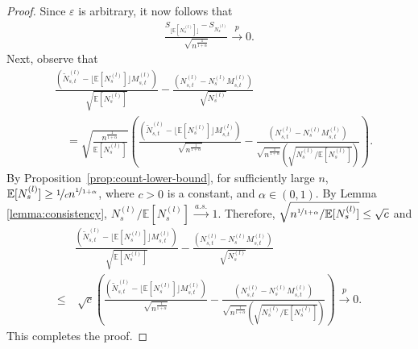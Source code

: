 \documentclass[twoside,11pt]{article}
\newcommand{\pow}[1]{^{(#1)}}%
\numberwithin{equation}{section}
\newcommand{\lp}{\left(}
\newcommand{\rp}{\right)}
\newcommand{\expec}{\mathbb{E}}
\newcommand{\eps}{\varepsilon}
\renewcommand{\epsilon}{\eps}
\begin{document}
\begin{proof}
    Since $\epsilon$ is arbitrary, it now follows that
    \begin{align*}
        \frac{S_{\lfloor \expec[N_s \pow l] \rfloor}-S_{N_s \pow l}}{\sqrt{n^{\frac{1}{1+\alpha}}}}\xrightarrow{\ p\ }0.
    \end{align*}
    Next, observe that
    \begin{align*}
        & \frac{\lp\tilde N_{s,t}\pow l - \lfloor \expec[N_s \pow l]\rfloor M_{s,t}\pow l \rp}{\sqrt{\expec[N_s \pow l]}} - \frac{\lp{ N_{s,t}\pow l-N_{s}\pow l M_{s,t}\pow l}\rp}{\sqrt{N_s \pow l}}\\
        & \quad =\sqrt{\frac{n^{\frac{1}{1+\alpha}}}{\expec[N_s \pow l]}}\lp \frac{\lp\tilde N_{s,t}\pow l - \lfloor \expec[N_s \pow l]\rfloor M_{s,t}\pow l \rp}{\sqrt{n^{\frac{1}{1+\alpha}}}} - \frac{\lp{ N_{s,t}\pow l-N_{s}\pow l M_{s,t}\pow l}\rp}{\sqrt{n^{\frac{1}{1+\alpha}}}\lp\sqrt{{N_s \pow l}/{\expec[N_s \pow l]}}\rp}\rp.
    \end{align*}
    By Proposition~\ref{prop:count-lower-bound}, for sufficiently large $n$, $\expec[N_s \pow l] \geq \nicefrac{1}{c} n^{\nicefrac{1}{1+\alpha}}$, where $c > 0$ is a constant, and $\alpha \in (0,1)$. 
    By Lemma \ref{lemma:consistency}, $N_s \pow l/\expec[N_s \pow l]\xrightarrow{\ a.s. \ }1$. Therefore, $\sqrt{{n^{\nicefrac{1}{1+\alpha}}}/{\expec[N_s \pow l]}}\leq \sqrt{c}$ and 
    \begin{align*}
        & \frac{\lp\tilde N_{s,t}\pow l - \lfloor \expec[N_s \pow l]\rfloor M_{s,t}\pow l \rp}{\sqrt{\expec[N_s \pow l]}} - \frac{\lp{ N_{s,t}\pow l-N_{s}\pow l M_{s,t}\pow l}\rp}{\sqrt{N_s \pow l}} \\
        \leq & \ \sqrt{c}\lp \frac{\lp\tilde N_{s,t}\pow l - \lfloor \expec[N_s \pow l]\rfloor M_{s,t}\pow l \rp}{\sqrt{n^{\frac{1}{1+\alpha}}}} - \frac{\lp{ N_{s,t}\pow l-N_{s}\pow l M_{s,t}\pow l}\rp}{\sqrt{n^{\frac{1}{1+\alpha}}}\lp\sqrt{{N_s \pow l}/{\expec[N_s \pow l]}}\rp}\rp
        \xrightarrow{\ p \ }  0.
    \end{align*}
    This completes the proof.
\end{proof}
\end{document}

